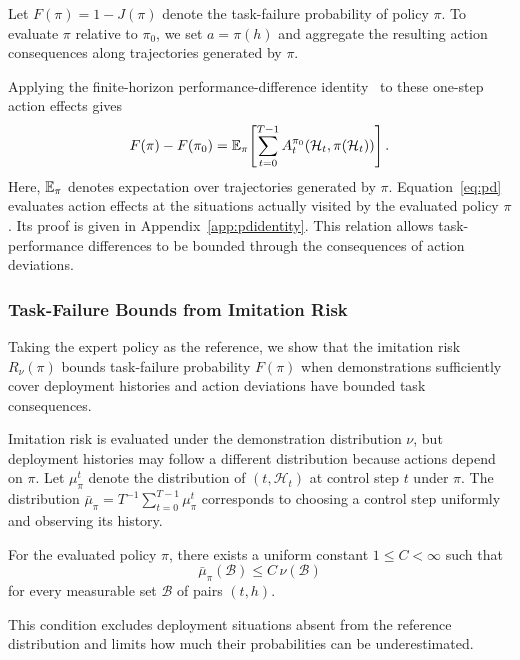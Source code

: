 Let $F(\pi)=1-J(\pi)$ denote the task-failure probability of policy $\pi$.
To evaluate $\pi$ relative to $\pi_0$, we set $a=\pi(h)$
and aggregate the resulting action consequences along trajectories generated by $\pi$.

Applying the finite-horizon performance-difference identity~\cite{kakade2002,ross2014aggrevate,cheng2018value}
to these one-step action effects gives
\begin{equation}
 F(\pi)-F(\pi_0)
 =\mathbb E_\pi\!\left[
 \sum_{t=0}^{T-1}A_t^{\pi_0}(\mathcal H_t,\pi(\mathcal H_t))
 \right].
\label{eq:pd}
\end{equation}
Here, $\mathbb E_\pi$ denotes expectation over trajectories generated by $\pi$.
Equation~\eqref{eq:pd} evaluates action effects at the situations actually visited by the evaluated policy $\pi$.
Its proof is given in Appendix~\ref{app:pdidentity}.
This relation allows task-performance differences to be
bounded through the consequences of action deviations.


\subsubsection{Task-Failure Bounds from Imitation Risk}
\label{sec:actionerrorbound}
Taking the expert policy as the reference,
we show that the imitation risk $R_\nu(\pi)$ bounds task-failure probability $F(\pi)$
when demonstrations sufficiently cover deployment histories
and action deviations have bounded task consequences.

Imitation risk is evaluated under the demonstration distribution $\nu$,
but deployment histories may follow a different distribution because actions depend on $\pi$.
Let $\mu_\pi^t$ denote the distribution of $(t,\mathcal H_t)$ at control step $t$ under $\pi$.
The distribution $\bar\mu_\pi=T^{-1}\sum_{t=0}^{T-1}\mu_\pi^t$ corresponds to choosing
a control step uniformly and observing its history.

\begin{assumption}
\label{ass:democoverage}

For the evaluated policy $\pi$, there exists a uniform constant
$1\le C<\infty$ such that
\[
\bar\mu_\pi(\mathcal B)\le C\,\nu(\mathcal B)
\]
for every measurable set $\mathcal B$ of pairs $(t,h)$.
\end{assumption}
This condition excludes deployment situations absent from the reference distribution and limits how much their probabilities can be underestimated.

